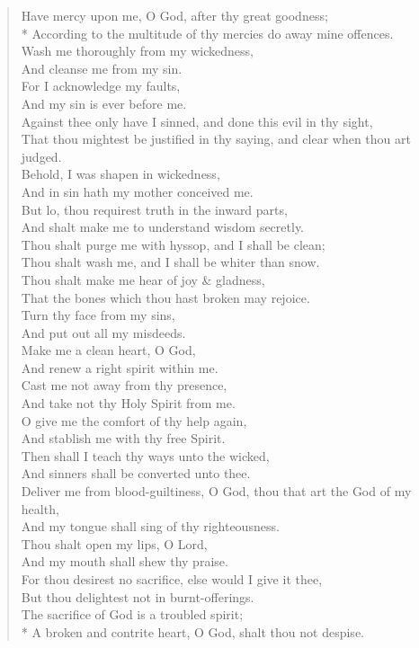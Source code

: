 \documentclass[MAIN]{subfiles}
\begin{document}
\begin{verse}
Have mercy upon me, O God, after thy great goodness;\\*
\vin According to the multitude of thy mercies do away mine offences.\\
Wash me thoroughly from my wickedness,\\
\vin And cleanse me from my sin.\\
For I acknowledge my faults,\\
\vin And my sin is ever before me.\\
Against thee only have I sinned, and done this evil in thy sight,\\
\vin That thou mightest be justified in thy saying, and clear when thou art judged.\\
Behold, I was shapen in wickedness,\\
\vin And in sin hath my mother conceived me.\\
But lo, thou requirest truth in the inward parts,\\
\vin And shalt make me to understand wisdom secretly.\\
Thou shalt purge me with hyssop, and I shall be clean;\\
\vin Thou shalt wash me, and I shall be whiter than snow.\\
Thou shalt make me hear of joy \& gladness,\\
\vin That the bones which thou hast broken may rejoice.\\
Turn thy face from my sins,\\
\vin And put out all my misdeeds.\\
Make me a clean heart, O God,\\
\vin And renew a right spirit within me.\\
Cast me not away from thy presence,\\
\vin And take not thy Holy Spirit from me.\\
O give me the comfort of thy help again,\\
\vin And stablish me with thy free Spirit.\\
Then shall I teach thy ways unto the wicked,\\
\vin And sinners shall be converted unto thee.\\
Deliver me from blood-guiltiness, O God, thou that art the God of my health,\\
\vin And my tongue shall sing of thy righteousness.\\
Thou shalt open my lips, O Lord,\\
\vin And my mouth shall shew thy praise.\\
For thou desirest no sacrifice, else would I give it thee,\\
\vin But thou delightest not in burnt-offerings.\\
The sacrifice of God is a troubled spirit;\\*
\vin A broken and contrite heart, O God, shalt thou not despise.
\end{verse}
\end{document}
